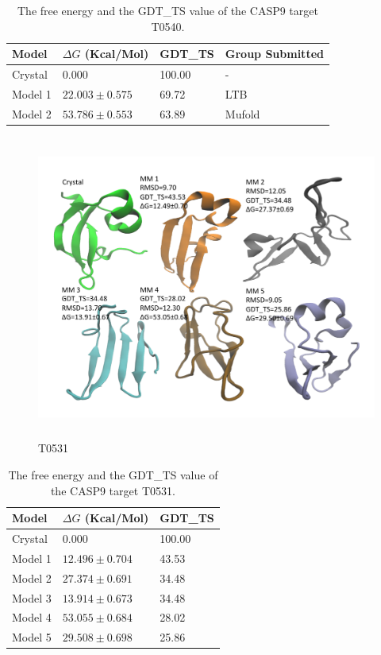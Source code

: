 \documentclass[12pt]{article}
\begin{document}
\begin{table}
\caption{The free energy and the GDT\_TS value of the CASP9 target T0540.}
\label{tab:T0540}
\begin{center}
\begin{tabular}{l l l l}\hline
Model   &     $\Delta G$ (Kcal/Mol) &  GDT\_TS & Group Submitted \\ \hline
Crystal &     0.000              &  100.00   & -      \\
Model 1 &     $22.003 \pm 0.575$ &  69.72    & LTB    \\
Model 2 &     $53.786 \pm 0.553$ &  63.89    & Mufold \\ \hline
\end{tabular}
\end{center}
\end{table}

\begin{figure}
\begin{center}
\includegraphics[width=12cm,height=10cm]{T0531.pdf}
\end{center}
\caption{T0531}
\label{fig:T0531}
\end{figure}

\begin{table}
\caption{The free energy and the GDT\_TS value of the CASP9 target T0531.}
\label{tab:T0531}
\begin{center}
\begin{tabular}{l l l}\hline
Model   &     $\Delta G$ (Kcal/Mol) &  GDT\_TS \\ \hline
Crystal &     0.000              & 100.00    \\
Model 1 &     $12.496 \pm 0.704$ &  43.53    \\
Model 2 &     $27.374 \pm 0.691$ &  34.48    \\
Model 3 &     $13.914 \pm 0.673$ &  34.48    \\
Model 4 &     $53.055 \pm 0.684$ &  28.02    \\
Model 5 &     $29.508 \pm 0.698$ &  25.86   \\ \hline
\end{tabular}
\end{center}
\end{table}
\end{document}
